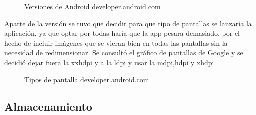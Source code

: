 \begin{figure}[H] 
  \begin{center} 
    \caption{Versiones de Android developer.android.com} 
    \label{fig:VersionesAndroid} 
  \end{center} 
\end{figure}

Aparte de la versión se tuvo que decidir para que tipo de pantallas se lanzaría la aplicación, ya que optar por todas haría que la app pesara demasiado, por el hecho de incluir imágenes que se vieran bien en todas las pantallas sin la necesidad de redimensionar.
Se consultó el gráfico de pantallas de Google y se decidió dejar fuera la xxhdpi y a la ldpi y usar la mdpi,hdpi y xhdpi.

\begin{figure}[H] 
  \begin{center} 
    \caption{Tipos de pantalla developer.android.com} 
    \label{fig:TiposPantalla} 
  \end{center} 
\end{figure}

\subsection{Almacenamiento}
\label{subsecc:Almacenamiento}

